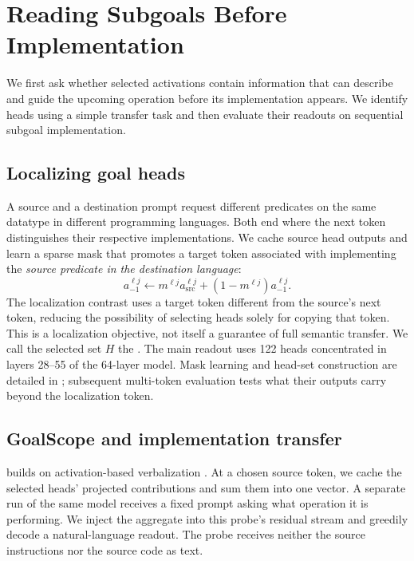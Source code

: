 \section{Reading Subgoals Before Implementation}
\label{sec:what}
We first ask whether selected activations contain information that can describe and guide the upcoming operation before its implementation appears. We identify heads using a simple transfer task and then evaluate their readouts on sequential subgoal implementation.

\subsection{Localizing goal heads}
\label{sec:what:approach}
\label{sec:heads:localize}
A source and a destination prompt request different predicates on the same datatype in different programming languages. Both end where the next token distinguishes their respective implementations. We cache source head outputs and learn a sparse mask that promotes a target token associated with implementing the \emph{source predicate in the destination language}:
\begin{equation}
a_{-1}^{\ell j}\leftarrow m^{\ell j}a_{\mathrm{src}}^{\ell j}+(1-m^{\ell j})a_{-1}^{\ell j}.
\label{eqn:opt-int}
\end{equation}
The localization contrast uses a target token different from the source's next token, reducing the possibility of selecting heads solely for copying that token. This is a localization objective, not itself a guarantee of full semantic transfer. We call the selected set $H$ the \goalheads. The main readout uses 122 heads concentrated in layers 28--55 of the 64-layer model. Mask learning and head-set construction are detailed in ; subsequent multi-token evaluation tests what their outputs carry beyond the localization token.

\subsection{GoalScope and implementation transfer}
\label{sec:what:readout}
\goalscope builds on activation-based verbalization \citep{ghandeharioun2024patchscope}. At a chosen source token, we cache the selected heads' projected contributions and sum them into one vector. A separate run of the same model receives a fixed prompt asking what operation it is performing. We inject the aggregate into this probe's residual stream and greedily decode a natural-language readout. The probe receives neither the source instructions nor the source code as text.


